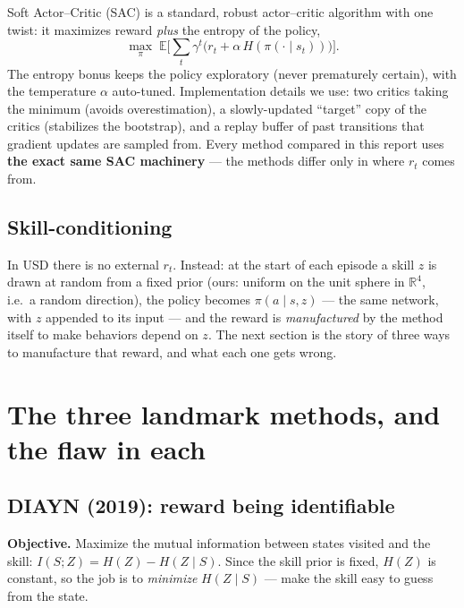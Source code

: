 \documentclass[11pt,a4paper]{article}
\begin{document}
Soft Actor--Critic (SAC) is a standard, robust actor--critic algorithm with one
twist: it maximizes reward \emph{plus} the entropy of the policy,
\[
\max_\pi\; \mathbb{E}\Big[\textstyle\sum_t \gamma^t \big( r_t + \alpha\, H(\pi(\cdot \mid s_t)) \big)\Big].
\]
The entropy bonus keeps the policy exploratory (never prematurely certain), with
the temperature $\alpha$ auto-tuned. Implementation details we use: two critics
taking the minimum (avoids overestimation), a slowly-updated ``target'' copy of
the critics (stabilizes the bootstrap), and a replay buffer of past transitions
that gradient updates are sampled from. Every method compared in this report uses
\textbf{the exact same SAC machinery} --- the methods differ only in where $r_t$
comes from.

\subsection{Skill-conditioning}

In USD there is no external $r_t$. Instead: at the start of each episode a skill
$z$ is drawn at random from a fixed prior (ours: uniform on the unit sphere in
$\mathbb{R}^4$, i.e.\ a random direction), the policy becomes $\pi(a \mid s, z)$
--- the same network, with $z$ appended to its input --- and the reward is
\emph{manufactured} by the method itself to make behaviors depend on $z$. The next
section is the story of three ways to manufacture that reward, and what each one
gets wrong.

\section{The three landmark methods, and the flaw in each}

\subsection{DIAYN (2019): reward being identifiable}

\textbf{Objective.} Maximize the mutual information between states visited and
the skill: $I(S;Z) = H(Z) - H(Z \mid S)$. Since the skill prior is fixed, $H(Z)$
is constant, so the job is to \emph{minimize} $H(Z \mid S)$ --- make the skill
easy to guess from the state.
\end{document}
